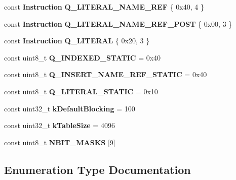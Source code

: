 \begin{DoxyCompactItemize}
const {\bf Instruction} {\bf Q\+\_\+\+L\+I\+T\+E\+R\+A\+L\+\_\+\+N\+A\+M\+E\+\_\+\+R\+EF} \{ 0x40, 4 \}
\item 
const {\bf Instruction} {\bf Q\+\_\+\+L\+I\+T\+E\+R\+A\+L\+\_\+\+N\+A\+M\+E\+\_\+\+R\+E\+F\+\_\+\+P\+O\+ST} \{ 0x00, 3 \}
\item 
const {\bf Instruction} {\bf Q\+\_\+\+L\+I\+T\+E\+R\+AL} \{ 0x20, 3 \}
\item 
const uint8\+\_\+t {\bf Q\+\_\+\+I\+N\+D\+E\+X\+E\+D\+\_\+\+S\+T\+A\+T\+IC} = 0x40
\item 
const uint8\+\_\+t {\bf Q\+\_\+\+I\+N\+S\+E\+R\+T\+\_\+\+N\+A\+M\+E\+\_\+\+R\+E\+F\+\_\+\+S\+T\+A\+T\+IC} = 0x40
\item 
const uint8\+\_\+t {\bf Q\+\_\+\+L\+I\+T\+E\+R\+A\+L\+\_\+\+S\+T\+A\+T\+IC} = 0x10
\item 
const uint32\+\_\+t {\bf k\+Default\+Blocking} = 100
\item 
const uint32\+\_\+t {\bf k\+Table\+Size} = 4096
\item 
const uint8\+\_\+t {\bf N\+B\+I\+T\+\_\+\+M\+A\+S\+KS} [9]
\end{DoxyCompactItemize}


\subsection{Enumeration Type Documentation}
